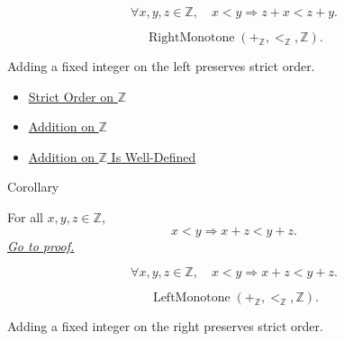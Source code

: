 \begin{remark*}
\[
\forall x,y,z\in\mathbb{Z},\quad
x<y \Longrightarrow z+x<z+y.
\]
\end{remark*}

\begin{remark*}
\[
\operatorname{RightMonotone}(+_{\mathbb{Z}},<_{\mathbb{Z}},\mathbb{Z}).
\]
\end{remark*}

\begin{remark*}[Interpretation]
Adding a fixed integer on the left preserves strict order.
\end{remark*}

\begin{dependencies}
\begin{itemize}
  \item \hyperref[def:strict-order-on-z]{Strict Order on $\mathbb{Z}$}
  \item \hyperref[def:addition-on-z-classes]{Addition on $\mathbb{Z}$}
  \item \hyperref[thm:addition-on-z-well-defined]{Addition on $\mathbb{Z}$ Is Well-Defined}
\end{itemize}
\end{dependencies}

\begin{corollarybox}{Corollary}
\begin{corollary}
\label{cor:right-addition-preserves-strict-order-on-z}
For all $x,y,z\in\mathbb{Z}$,
\[
x<y \Longrightarrow x+z<y+z.
\]
\hyperref[prf:right-addition-preserves-strict-order-on-z]{\textit{Go to proof.}}
\end{corollary}
\end{corollarybox}

\begin{remark*}
\[
\forall x,y,z\in\mathbb{Z},\quad
x<y \Longrightarrow x+z<y+z.
\]
\end{remark*}

\begin{remark*}
\[
\operatorname{LeftMonotone}(+_{\mathbb{Z}},<_{\mathbb{Z}},\mathbb{Z}).
\]
\end{remark*}

\begin{remark*}[Interpretation]
Adding a fixed integer on the right preserves strict order.
\end{remark*}

